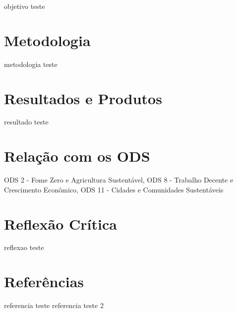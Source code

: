 \documentclass[12pt,a4paper]{article}
\begin{document}
objetivo teste


\section*{Metodologia}

metodologia teste


\section*{Resultados e Produtos}

resultado teste


\section*{Relação com os ODS}

ODS 2 - Fome Zero e Agricultura Sustentável, ODS 8 - Trabalho Decente e Crescimento Econômico, ODS 11 - Cidades e Comunidades Sustentáveis


\section*{Reflexão Crítica }

reflexao teste


\section*{Referências}

referencia teste
referencia teste 2
\end{document}
